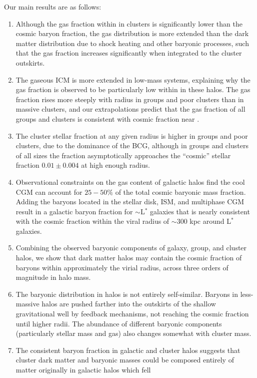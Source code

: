 Our main results are as follows:
\begin{enumerate}
\item Although the gas fraction within \rfive{} in clusters is
  significantly lower than the cosmic baryon fraction, the gas
  distribution is more extended than the dark matter distribution due
  to shock heating and other baryonic processes, such that the gas
  fraction increases significantly when integrated to the cluster
  outskirts.
\item The gaseous ICM is more extended in low-mass systems, explaining
  why the gas fraction is observed to be particularly low within
  \rfive{} in these halos. The gas fraction rises more steeply with
  radius in groups and poor clusters than in massive clusters, and our
  extrapolations predict that the gas fraction of all groups and
  clusters is consistent with cosmic fraction near \rvir{}.
\item The cluster stellar fraction at any given radius is higher in
  groups and poor clusters, due to the dominance of the BCG, although
  in groups and clusters of all sizes the fraction asymptotically approaches the
  ``cosmic'' stellar fraction $0.01\pm0.004$ at high enough radius.
\item Observational constraints on the gas content of galactic halos
  find the cool CGM can account for $25-50\%$ of the total cosmic
  baryonic mass fraction. Adding the baryons located in the stellar
  disk, ISM, and multiphase CGM result in a galactic baryon fraction
  for $\sim$L$^*$ galaxies that is nearly consistent with the cosmic
  fraction within the viral radius of $\sim300$ kpc around L$^*$
  galaxies.
\item Combining the observed baryonic components of galaxy, group, and
  cluster halos, we show that dark matter halos may contain the cosmic
  fraction of baryons within approximately the virial radius, across
  three orders of magnitude in halo mass.
\item The baryonic distribution in halos is not entirely
  self-similar. Baryons in less-massive halos are pushed farther into
  the outskirts of the shallow gravitational well by feedback
  mechanisms, not reaching the cosmic fraction until higher radii. The
  abundance of different baryonic components (particularly stellar
  mass and gas) also changes somewhat with cluster mass.
\item The consistent baryon fraction in galactic and cluster halos
  suggests that cluster dark matter and baryonic masses could be
  composed entirely of matter originally in galactic halos which fell

\end{enumerate}

